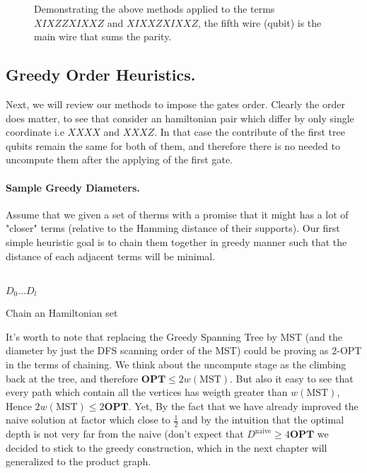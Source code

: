 \documentclass{article}
\begin{document}
\begin{figure*}[h]
    
    \caption{ Demonstrating the above methods applied to the terms \( XIXZZXIXXZ \) and \( XIXXZXIXXZ \), the fifth wire (qubit) is the main wire that sums the parity.}
    \label{fig:average-data-vs-model}
\end{figure*}
\begin{multicols}{2}

\section{Greedy Order Heuristics.}
Next, we will review our methods to impose the gates order. Clearly the order does matter, to see that consider an hamiltonian pair which differ by only single coordinate i.e \(XXXX\) and \(XXXZ\). In that case the contribute of the first tree qubits remain the same for both of them, and therefore there is no needed to uncompute them after the applying of the first gate.      
\paragraph{Sample Greedy Diameters.} Assume that we given a set of therms with a promise that it might has a lot of "closer" terms (relative to the Hamming distance of their supports). Our first simple heuristic goal is to chain them together in greedy manner such that the distance of each adjacent terms will be minimal. 

\begin{algorithm*}[h]
\SetAlgoLined
\ \\ 
\Return \(D_{0} ... D_{l}\) 
 \caption{Chain an Hamiltonian set }
\end{algorithm*}

It's worth to note that replacing the Greedy Spanning Tree by MST (and the diameter by just the DFS scanning order of the MST) could be proving as 2-OPT in the terms of chaining. We think about the uncompute stage as the climbing back at the tree, and therefore \( \textbf{OPT} \le 2w\left(\text{MST} \right) \). But also it easy to see that every path which contain all the vertices has weigth greater than \(w\left(\text{MST} \right) \), Hence  \(2w\left(\text{MST} \right) \le 2\textbf{OPT}\).          
Yet, By the fact that we have already improved the naive solution at factor which close to \(\frac{1}{2}\) and by the intuition that the optimal depth is not very far from the naive (don't expect that \( D^{\text{naive}} \ge 4 \textbf{OPT} \) we decided to stick to the greedy construction, which in the next chapter will generalized to the product graph. 


\end{multicols}
\end{document}
